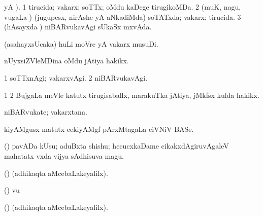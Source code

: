 {{{{{{\begin{center}
{{\bentry
{} 
\gl{\gu}
 yA ). \bmng
\bnum
\num{1} tirucida; vakarx; soTTx; oMdu kaDege tirugikoMDa. 
\num{2} (muK, nagu, \mo vugaLa \vi) (jugupesx, nirAshe yA aNkadiMda) soTATxda; vakarx; tirucida. 
\num{3} (hAsayxda \vi) niBARvukavAgi sUkaSx mxvAda. 
\enum
\emng

\noindent
\gl{\pagu}
\expl{}
\bmng
{} (asahayxsUcaka) huLi moVre yA vakarx musuDi. 
\emng
\eentry

\bentry
{} 
\gl{\nA}
\expl{}
\bmng
nUyxsiZVleMDina oMdu jAtiya hakikx. 
\emng
\eentry

\bentry
{} 
\gl{\kirxvi}
\expl{}
\bmng
\bnum
\num{1} soTTxnAgi; vakarxvAgi. 
\num{2} niBARvukavAgi. 
\enum
\emng
\eentry

\bentry
{} 
\gl{\nA}
\expl{}
\bmng
\bnum
\num{1}  
\num{2} BujgaLa meVle katutx tirugisaballx, marakuTka jAtiya, jMkfsx kulda hakikx. 
\enum
\emng
\eentry

\bentry
{} 
\gl{\nA}
\expl{}
\bmng
niBARvukate; vakarxtana. 
\emng
\eentry

\bentry
{} 
\gl{\saMkiSx}
\expl{}
\bmng
{} 
\emng
\eentry

\bentry
{} 
\gl{\saMkiSx}
\expl{}
\bmng
{} 
\emng
\eentry

\bentry
{} 
\gl{\nA}
\expl{}
\bmng
kiyAMgusx matutx cekiyAMgf pArxMtagaLa ciVNiV BASe. 
\emng
\eentry

\bentry
{} 
\gl{\nA}
\expl{}
\bmng
(\AmA) pavADa kUsu; aduBxta shishu; hecucxkaDame cikakxdAgiruvAgaleV mahatatx vxda vijya sAdhisuva magu. 
\emng
\eentry

\bentry
{} 
\gl{\saMkiSx}
\expl{}
\bmng
(\ame)  (adhikaqta aMcebaLakeyalilx). 
\emng
\eentry

\bentry
{} 
\gl{\saMkiSx}
\expl{}
\bmng
(\ame)  \mo vu 
\emng
\eentry

\bentry
{} 
\gl{\saMkiSx}
\expl{}
\bmng
{} 
\emng
\eentry

\bentry
{} 
\gl{\saMkiSx}
\expl{}
\bmng
(\ame)  (adhikaqta aMcebaLakeyalilx). 
\emng
\eentry

}}
\end{center}}}}}}}
